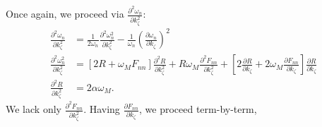 \documentclass{article}
\begin{document}
Once again, we proceed via $\frac{\partial^2 \omega_{n}}{\partial k_{\zeta}^2}$:
\begin{align}
\frac{\partial^2 \omega_{n}}{\partial k_{\zeta}^2} &= \frac{1}{2 \omega_{n}} \frac{\partial^2 \omega_{n}^2}{\partial k_{\zeta}^2} - \frac{1}{\omega_{n}} \left(\frac{\partial \omega_{n}}{\partial k_{\zeta}}\right)^2 \\
\frac{\partial^2 \omega_{n}^2}{\partial k_{\zeta}^2} &= \left[2R + \omega_{M} F_{nn} \right] \frac{\partial^2 R}{\partial k_{\zeta}^2} + R \omega_{M} \frac{\partial^2 F_{nn}}{\partial k_{\zeta}^2} + \left[ 2 \frac{\partial R}{\partial k_{\zeta}} + 2 \omega_{M} \frac{\partial F_{nn}}{\partial k_{\zeta}} \right] \frac{\partial R}{\partial k_{\zeta}} \\
\frac{\partial^2 R}{\partial k_{\zeta}^2} &= 2 \alpha \omega_{M}.
\end{align}
We lack only $\frac{\partial^2 F_{nn}}{\partial k_{\zeta}^2}$. Having $\frac{\partial F_{nn}}{\partial k_{\zeta}}$, we proceed term-by-term,
\end{document}

